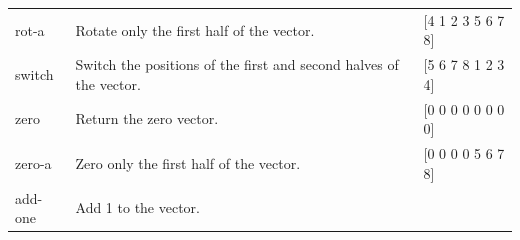 \documentclass[12pt,twoside]{mitthesis}
\begin{document}
\begin{longtable}[c]{@{}lll@{}}
\begin{minipage}[t]{0.14\columnwidth}\raggedright\strut
rot-a
\strut\end{minipage} &
\begin{minipage}[t]{0.55\columnwidth}\raggedright\strut
Rotate only the first half of the vector.
\strut\end{minipage} &
\begin{minipage}[t]{0.22\columnwidth}\raggedright\strut
{[}4 1 2 3 5 6 7 8{]}
\strut\end{minipage}\tabularnewline
\begin{minipage}[t]{0.14\columnwidth}\raggedright\strut
switch
\strut\end{minipage} &
\begin{minipage}[t]{0.55\columnwidth}\raggedright\strut
Switch the positions of the first and second halves of the vector.
\strut\end{minipage} &
\begin{minipage}[t]{0.22\columnwidth}\raggedright\strut
{[}5 6 7 8 1 2 3 4{]}
\strut\end{minipage}\tabularnewline
\begin{minipage}[t]{0.14\columnwidth}\raggedright\strut
zero
\strut\end{minipage} &
\begin{minipage}[t]{0.55\columnwidth}\raggedright\strut
Return the zero vector.
\strut\end{minipage} &
\begin{minipage}[t]{0.22\columnwidth}\raggedright\strut
{[}0 0 0 0 0 0 0 0{]}
\strut\end{minipage}\tabularnewline
\begin{minipage}[t]{0.14\columnwidth}\raggedright\strut
zero-a
\strut\end{minipage} &
\begin{minipage}[t]{0.55\columnwidth}\raggedright\strut
Zero only the first half of the vector.
\strut\end{minipage} &
\begin{minipage}[t]{0.22\columnwidth}\raggedright\strut
{[}0 0 0 0 5 6 7 8{]}
\strut\end{minipage}\tabularnewline
\begin{minipage}[t]{0.14\columnwidth}\raggedright\strut
add-one
\strut\end{minipage} &
\begin{minipage}[t]{0.55\columnwidth}\raggedright\strut
Add 1 to the vector.
\strut\end{minipage} &
\begin{minipage}[t]{0.22\columnwidth}\raggedright\strut

\end{minipage}
\end{longtable}
\end{document}
